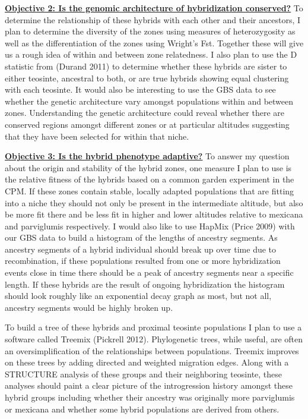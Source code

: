 \documentclass[12pt]{amsart}
\begin{document}
\hfill\break \textbf{\underline{Objective 2: Is the genomic architecture of hybridization conserved?} } To determine the relationship of these hybrids with each other and their ancestors, I plan to determine the diversity of the zones using measures of heterozygosity as well as the differentiation of the zones using Wright's Fst.  
Together these will give us a rough idea of within and between zone relatedness.
I also plan to use the D statistic from (Durand 2011) to determine whether these hybrids are sister to either teosinte, ancestral to both, or are true hybrids showing equal clustering with each teosinte.
It would also be interesting to use the GBS data to see whether the genetic architecture vary amongst populations within and between zones.
Understanding the genetic architecture could reveal whether there are conserved regions amongst different zones or at particular altitudes suggesting that they have been selected for within that niche.

\hfill\break \textbf{\underline{Objective 3: Is the hybrid phenotype adaptive?} }To answer my question about the origin and stability of the hybrid zones, one measure I plan to use is the relative fitness of the hybrids based on a common garden experiment in the CPM. 
If these zones contain stable, locally adapted populations that are fitting into a niche they should not only be present in the intermediate altitude, but also be more fit there and be less fit in higher and lower altitudes relative to mexicana and parviglumis respectively.
I would also like to use HapMix (Price 2009) with our GBS data to build a histogram of the lengths of ancestry segments.
As ancestry segments of a hybrid individual should break up over time due to recombination, if these populations resulted from one or more hybridization events close in time there should be a peak of ancestry segments near a specific length.
If these hybrids are the result of ongoing hybridization the histogram should look roughly like an exponential decay graph as most, but not all, ancestry segments would be highly broken up.

To build a tree of these hybrids and proximal teosinte populations I plan to use a software called Treemix (Pickrell 2012).
Phylogenetic trees, while useful, are often an oversimplification of the relationships between populations. %
Treemix improves on these trees by adding directed and weighted migration edges. %
Along with a STRUCTURE analysis of these groups and their neighboring teosinte, these analyses should paint a clear picture of the introgression history amongst these hybrid groups including whether their ancestry was originally more parviglumis or mexicana and whether some hybrid populations are derived from others.
\end{document}
